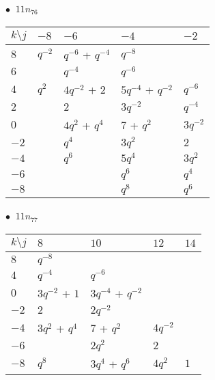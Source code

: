 \begin{minipage}{\linewidth}
$\bullet\ $ $11n_{76}$ \vspace{0.5em} \\
\begin{tabular}{l|llll}
$k \setminus j$ & $-8$ & $-6$ & $-4$ & $-2$ \\
\hline
$8$ & $q^{-2}$ & $q^{-6}$ + $q^{-4}$ & $q^{-8}$ &  \\
$6$ &  & $q^{-4}$ & $q^{-6}$ &  \\
$4$ & $q^{2}$ & $4q^{-2}$ + $2$ & $5q^{-4}$ + $q^{-2}$ & $q^{-6}$ \\
$2$ &  & $2$ & $3q^{-2}$ & $q^{-4}$ \\
$0$ &  & $4q^{2}$ + $q^{4}$ & $7$ + $q^{2}$ & $3q^{-2}$ \\
$-2$ &  & $q^{4}$ & $3q^{2}$ & $2$ \\
$-4$ &  & $q^{6}$ & $5q^{4}$ & $3q^{2}$ \\
$-6$ &  &  & $q^{6}$ & $q^{4}$ \\
$-8$ &  &  & $q^{8}$ & $q^{6}$ \\
\end{tabular}
\vspace{2em}
\end{minipage}
%
\begin{minipage}{\linewidth}
$\bullet\ $ $11n_{77}$ \vspace{0.5em} \\
\begin{tabular}{l|llll}
$k \setminus j$ & $8$ & $10$ & $12$ & $14$ \\
\hline
$8$ & $q^{-8}$ &  &  &  \\
$4$ & $q^{-4}$ & $q^{-6}$ &  &  \\
$0$ & $3q^{-2}$ + $1$ & $3q^{-4}$ + $q^{-2}$ &  &  \\
$-2$ & $2$ & $2q^{-2}$ &  &  \\
$-4$ & $3q^{2}$ + $q^{4}$ & $7$ + $q^{2}$ & $4q^{-2}$ &  \\
$-6$ &  & $2q^{2}$ & $2$ &  \\
$-8$ & $q^{8}$ & $3q^{4}$ + $q^{6}$ & $4q^{2}$ & $1$ \\
\end{tabular}
\vspace{2em}
\end{minipage}
%

